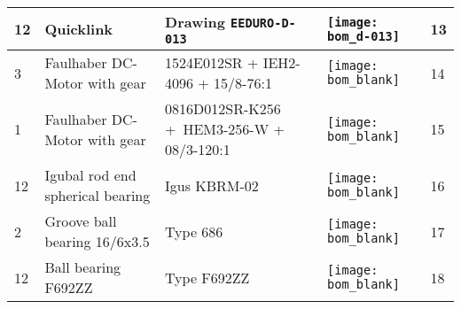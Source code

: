 \begin{tabular}{m{0.5cm} m{5cm} m{5cm} m{1cm} m{1.5cm}}
\hline
12   & Quicklink                                    & Drawing \texttt{EEDURO-D-013}    & \texttt{[image: bom\_d-013]}           & 13    \\
\hline
3    & Faulhaber DC-Motor with gear                 & 1524E012SR + IEH2-4096 + 15/8-76:1 & \texttt{[image: bom\_blank]}         & 14    \\
\hline
1    & Faulhaber DC-Motor with gear                 & 0816D012SR-K256 \mbox{+ HEM3-256-W} + 08/3-120:1 & \texttt{[image: bom\_blank]} & 15 \\
\hline
12   & Igubal rod end spherical bearing             & Igus KBRM-02                     & \texttt{[image: bom\_blank]}           & 16    \\
\hline
2    & Groove ball bearing 16/6x3.5                 & Type 686                         & \texttt{[image: bom\_blank]}           & 17    \\
\hline
12   & Ball bearing F692ZZ                          & Type F692ZZ                      & \texttt{[image: bom\_blank]}           & 18    \\
\hline
\end{tabular}

